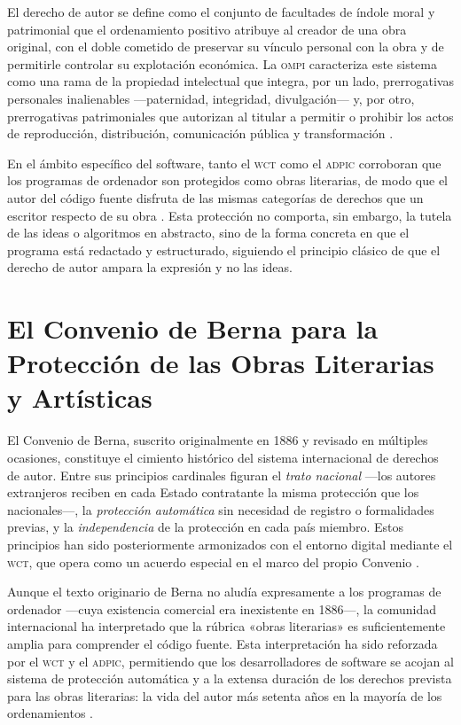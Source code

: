 \documentclass[11pt,a4paper]{report}
\begin{document}
El derecho de autor se define como el conjunto de facultades de índole moral y patrimonial que el ordenamiento positivo atribuye al creador de una obra original, con el doble cometido de preservar su vínculo personal con la obra y de permitirle controlar su explotación económica. La \textsc{ompi} caracteriza este sistema como una rama de la propiedad intelectual que integra, por un lado, prerrogativas personales inalienables —paternidad, integridad, divulgación— y, por otro, prerrogativas patrimoniales que autorizan al titular a permitir o prohibir los actos de reproducción, distribución, comunicación pública y transformación \citep{ompi2024}.

En el ámbito específico del software, tanto el \textsc{wct} como el \textsc{adpic} corroboran que los programas de ordenador son protegidos como obras literarias, de modo que el autor del código fuente disfruta de las mismas categorías de derechos que un escritor respecto de su obra \citep{ompi1996, omc1994}. Esta protección no comporta, sin embargo, la tutela de las ideas o algoritmos en abstracto, sino de la forma concreta en que el programa está redactado y estructurado, siguiendo el principio clásico de que el derecho de autor ampara la expresión y no las ideas.

\section{El Convenio de Berna para la Protección de las Obras Literarias y Artísticas}

El Convenio de Berna, suscrito originalmente en 1886 y revisado en múltiples ocasiones, constituye el cimiento histórico del sistema internacional de derechos de autor. Entre sus principios cardinales figuran el \textit{trato nacional} —los autores extranjeros reciben en cada Estado contratante la misma protección que los nacionales—, la \textit{protección automática} sin necesidad de registro o formalidades previas, y la \textit{independencia} de la protección en cada país miembro. Estos principios han sido posteriormente armonizados con el entorno digital mediante el \textsc{wct}, que opera como un acuerdo especial en el marco del propio Convenio \citep{ompi1996}.

Aunque el texto originario de Berna no aludía expresamente a los programas de ordenador —cuya existencia comercial era inexistente en 1886—, la comunidad internacional ha interpretado que la rúbrica «obras literarias» es suficientemente amplia para comprender el código fuente. Esta interpretación ha sido reforzada por el \textsc{wct} y el \textsc{adpic}, permitiendo que los desarrolladores de software se acojan al sistema de protección automática y a la extensa duración de los derechos prevista para las obras literarias: la vida del autor más setenta años en la mayoría de los ordenamientos \citep{ompi1996}.
\end{document}

